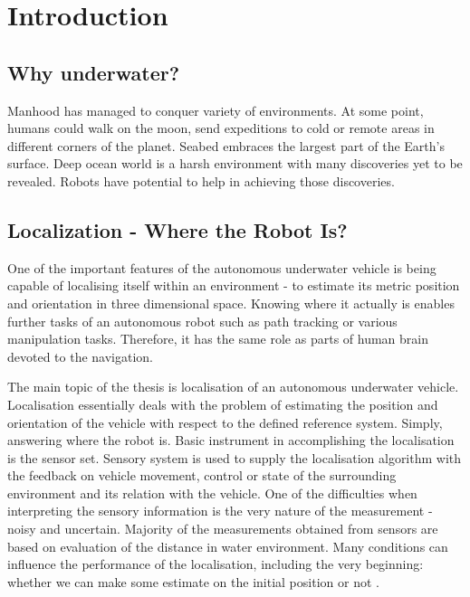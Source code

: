 \chapter{Introduction} \label{chap:intro}
\section{Why underwater?}
Manhood has managed to conquer variety of environments. At some point, humans could walk on the moon, send expeditions to cold or remote areas in different corners of the planet. Seabed embraces the largest part of the Earth's surface. Deep ocean world is a harsh environment with many discoveries yet to be revealed. Robots have potential to help in achieving those discoveries. 
\section{Localization - Where the Robot Is?}
One of the important features of the autonomous underwater vehicle is being capable of localising itself within an environment - to estimate its metric position and orientation in three dimensional space. Knowing where it actually is enables further tasks of an autonomous robot such as path tracking or various manipulation tasks. Therefore, it has the same role as parts of human brain devoted to the navigation.  

The main topic of the thesis is localisation of an autonomous underwater vehicle. Localisation essentially deals with the problem of estimating the position and orientation of the vehicle with respect to the defined reference system. Simply, answering where the robot is. Basic instrument in accomplishing the localisation is the sensor set. Sensory system is used to supply the localisation algorithm with the feedback on vehicle movement, control or state of the surrounding environment and its relation with the vehicle. One of the difficulties when interpreting the sensory information is the very nature of the measurement - noisy and uncertain. Majority of the measurements obtained from sensors are based on evaluation of the distance in water environment. Many conditions can influence the performance of the localisation, including the very beginning: whether we can make some estimate on the initial position or not \cite{ribas10}. 

